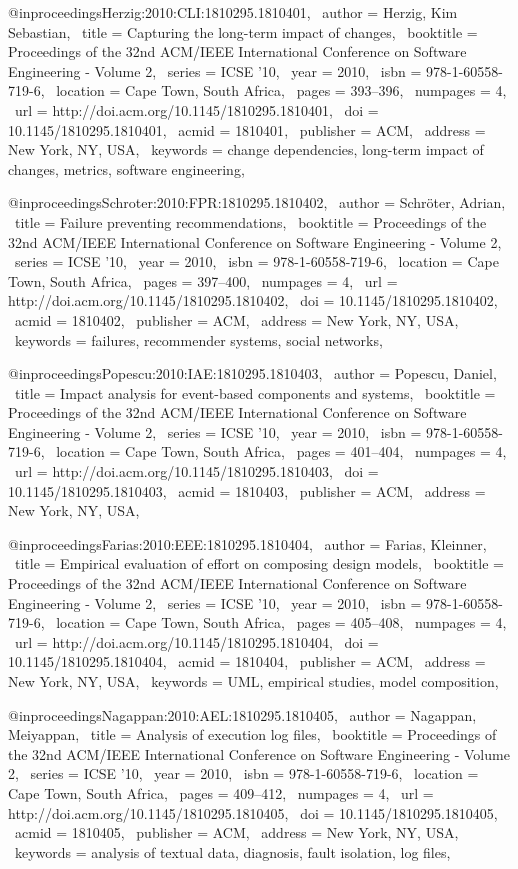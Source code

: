 @inproceedings{Herzig:2010:CLI:1810295.1810401,
 author = {Herzig, Kim Sebastian},
 title = {Capturing the long-term impact of changes},
 booktitle = {Proceedings of the 32nd ACM/IEEE International Conference on Software Engineering - Volume 2},
 series = {ICSE '10},
 year = {2010},
 isbn = {978-1-60558-719-6},
 location = {Cape Town, South Africa},
 pages = {393--396},
 numpages = {4},
 url = {http://doi.acm.org/10.1145/1810295.1810401},
 doi = {10.1145/1810295.1810401},
 acmid = {1810401},
 publisher = {ACM},
 address = {New York, NY, USA},
 keywords = {change dependencies, long-term impact of changes, metrics, software engineering},
} 

@inproceedings{Schroter:2010:FPR:1810295.1810402,
 author = {Schr\"{o}ter, Adrian},
 title = {Failure preventing recommendations},
 booktitle = {Proceedings of the 32nd ACM/IEEE International Conference on Software Engineering - Volume 2},
 series = {ICSE '10},
 year = {2010},
 isbn = {978-1-60558-719-6},
 location = {Cape Town, South Africa},
 pages = {397--400},
 numpages = {4},
 url = {http://doi.acm.org/10.1145/1810295.1810402},
 doi = {10.1145/1810295.1810402},
 acmid = {1810402},
 publisher = {ACM},
 address = {New York, NY, USA},
 keywords = {failures, recommender systems, social networks},
} 

@inproceedings{Popescu:2010:IAE:1810295.1810403,
 author = {Popescu, Daniel},
 title = {Impact analysis for event-based components and systems},
 booktitle = {Proceedings of the 32nd ACM/IEEE International Conference on Software Engineering - Volume 2},
 series = {ICSE '10},
 year = {2010},
 isbn = {978-1-60558-719-6},
 location = {Cape Town, South Africa},
 pages = {401--404},
 numpages = {4},
 url = {http://doi.acm.org/10.1145/1810295.1810403},
 doi = {10.1145/1810295.1810403},
 acmid = {1810403},
 publisher = {ACM},
 address = {New York, NY, USA},
} 

@inproceedings{Farias:2010:EEE:1810295.1810404,
 author = {Farias, Kleinner},
 title = {Empirical evaluation of effort on composing design models},
 booktitle = {Proceedings of the 32nd ACM/IEEE International Conference on Software Engineering - Volume 2},
 series = {ICSE '10},
 year = {2010},
 isbn = {978-1-60558-719-6},
 location = {Cape Town, South Africa},
 pages = {405--408},
 numpages = {4},
 url = {http://doi.acm.org/10.1145/1810295.1810404},
 doi = {10.1145/1810295.1810404},
 acmid = {1810404},
 publisher = {ACM},
 address = {New York, NY, USA},
 keywords = {UML, empirical studies, model composition},
} 

@inproceedings{Nagappan:2010:AEL:1810295.1810405,
 author = {Nagappan, Meiyappan},
 title = {Analysis of execution log files},
 booktitle = {Proceedings of the 32nd ACM/IEEE International Conference on Software Engineering - Volume 2},
 series = {ICSE '10},
 year = {2010},
 isbn = {978-1-60558-719-6},
 location = {Cape Town, South Africa},
 pages = {409--412},
 numpages = {4},
 url = {http://doi.acm.org/10.1145/1810295.1810405},
 doi = {10.1145/1810295.1810405},
 acmid = {1810405},
 publisher = {ACM},
 address = {New York, NY, USA},
 keywords = {analysis of textual data, diagnosis, fault isolation, log files},
} 

